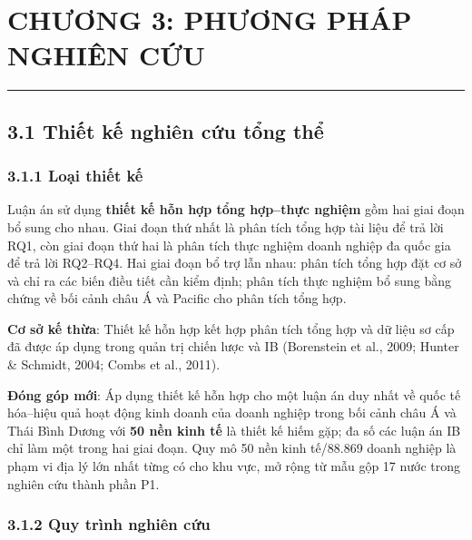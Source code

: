\documentclass[
  a4paper,
  13pt]{extreport}
\author{}
\date{}
\begin{document}
\hypertarget{chux1b0ux1a1ng-3-phux1b0ux1a1ng-phuxe1p-nghiuxean-cux1ee9u}{%
\chapter{CHƯƠNG 3: PHƯƠNG PHÁP NGHIÊN
CỨU}\label{chux1b0ux1a1ng-3-phux1b0ux1a1ng-phuxe1p-nghiuxean-cux1ee9u}}

\begin{center}\rule{0.5\linewidth}{0.5pt}\end{center}

\hypertarget{thiux1ebft-kux1ebf-nghiuxean-cux1ee9u-tux1ed5ng-thux1ec3}{%
\section{3.1 Thiết kế nghiên cứu tổng
thể}\label{thiux1ebft-kux1ebf-nghiuxean-cux1ee9u-tux1ed5ng-thux1ec3}}

\hypertarget{loux1ea1i-thiux1ebft-kux1ebf}{%
\subsection{3.1.1 Loại thiết kế}\label{loux1ea1i-thiux1ebft-kux1ebf}}

Luận án sử dụng \textbf{thiết kế hỗn hợp tổng hợp--thực nghiệm} gồm hai
giai đoạn bổ sung cho nhau. Giai đoạn thứ nhất là phân tích tổng hợp tài
liệu để trả lời RQ1, còn giai đoạn thứ hai là phân tích thực nghiệm
doanh nghiệp đa quốc gia để trả lời RQ2--RQ4. Hai giai đoạn bổ trợ lẫn
nhau: phân tích tổng hợp đặt cơ sở và chỉ ra các biến điều tiết cần kiểm
định; phân tích thực nghiệm bổ sung bằng chứng về bối cảnh châu Á và
Pacific cho phân tích tổng hợp.

\textbf{Cơ sở kế thừa}: Thiết kế hỗn hợp kết hợp phân tích tổng hợp và
dữ liệu sơ cấp đã được áp dụng trong quản trị chiến lược và IB
(Borenstein et al., 2009; Hunter \& Schmidt, 2004; Combs et al., 2011).

\textbf{Đóng góp mới}: Áp dụng thiết kế hỗn hợp cho một luận án duy nhất
về quốc tế hóa--hiệu quả hoạt động kinh doanh của doanh nghiệp trong bối
cảnh châu Á và Thái Bình Dương với \textbf{50 nền kinh tế} là thiết kế
hiếm gặp; đa số các luận án IB chỉ làm một trong hai giai đoạn. Quy mô
50 nền kinh tế/88.869 doanh nghiệp là phạm vi địa lý lớn nhất từng có
cho khu vực, mở rộng từ mẫu gộp 17 nước trong nghiên cứu thành phần P1.

\hypertarget{quy-truxecnh-nghiuxean-cux1ee9u}{%
\subsection{3.1.2 Quy trình nghiên
cứu}\label{quy-truxecnh-nghiuxean-cux1ee9u}}
\end{document}
